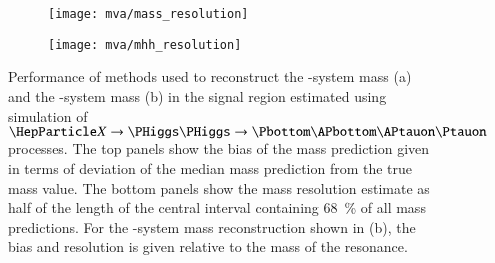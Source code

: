 



\begin{figure}[htbp]
  \centering

  \begin{subfigure}[t]{.5\textwidth}
    \centering
    \texttt{[image: mva/mass\_resolution]}
    \label{fig:mass_reconstruction_H}
  \end{subfigure}\hfill%
  \begin{subfigure}[t]{.5\textwidth}
    \centering
    \texttt{[image: mva/mhh\_resolution]}
    \label{fig:mass_reconstruction_HH}
  \end{subfigure}

  \caption{Performance of methods used to reconstruct the
    \PHiggs-system mass (a) and the \HH-system mass (b) in the \hadhad
    signal region estimated using simulation of
    $\PX \ra \HH \ra \bbtautau$ processes. The top panels show the
    bias of the mass prediction given in terms of deviation of the
    median mass prediction from the true mass value. The bottom panels
    show the mass resolution estimate as half of the length of the
    central interval containing \SI{68}{\percent} of all mass
    predictions. For the \HH-system mass reconstruction shown in (b),
    the bias and resolution is given relative to the mass of the
    resonance.}%
  \label{fig:mass_reconstruction}
\end{figure}

